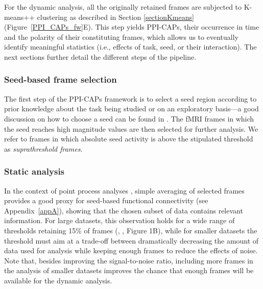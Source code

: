 For the dynamic analysis, all the originally retained frames are subjected to K-means++ clustering  \citep{Arthur2007} as described in Section \ref{sectionKmeans} (Figure~\ref{PPI_CAPs_fw}E). This step yields PPI-CAPs, their occurrence in time and the polarity of their constituting frames, which allows us to eventually identify meaningful statistics (i.e., effects of task, seed, or their interaction). The next sections further detail the different steps of the pipeline.

\subsubsection{Seed-based frame selection}

The first step of the PPI-CAPs framework is to select a seed region according to prior knowledge about the task being studied or on an exploratory basis---a good discussion on how to choose a seed can be found in \citet{OReilly2012a}. The fMRI frames in which the seed reaches high magnitude values are then selected for further analysis. We refer to frames in which absolute seed activity is above the stipulated threshold as \textit{suprathreshold frames}.

\subsubsection{Static analysis} \label{met:static_analysis}
In the context of point process analyses \citep{Tagliazucchi2012,Liu2013}, simple averaging of selected frames provides a good proxy for seed-based functional connectivity (see Appendix~\ref{appA}), showing that the chosen subset of data contains relevant information. For large datasets, this observation holds for a wide range of thresholds retaining 15\% of frames (\citeauthor{Liu2013}, \citeyear{Liu2013}, Figure 1B), while for smaller datasets the threshold must aim at a trade-off between dramatically decreasing the amount of data used for analysis while keeping enough frames to reduce the effects of noise. Note that, besides improving the signal-to-noise ratio, including more frames in the analysis of smaller datasets improves the chance that enough frames will be available for the dynamic analysis.

